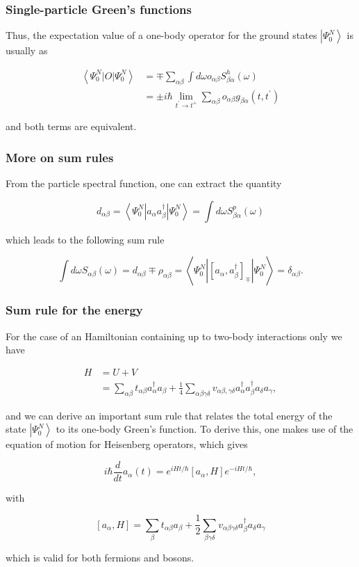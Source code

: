 \documentclass[compress]{beamer}
\begin{document}
\frame
{
\frametitle{Single-particle Green's functions}
\begin{small}
{\scriptsize
Thus, the expectation value of a one-body operator for the
ground states $\left|\Psi_{0}^{N}\right\rangle$ is usually as

$$
\begin{aligned}
\left\langle\Psi_{0}^{N}|O| \Psi_{0}^{N}\right\rangle & =\mp \sum_{\alpha \beta} \int d \omega o_{\alpha \beta} S_{\beta \alpha}^{h}(\omega) \\
& = \pm i \hbar \lim _{t^{\prime} \rightarrow t^{+}} \sum_{\alpha \beta} o_{\alpha \beta} g_{\beta \alpha}\left(t, t^{\prime}\right)
\end{aligned}
$$

and both terms are equivalent.

}
\end{small}
}


\frame
{
\frametitle{More on sum rules}
\begin{small}
{\scriptsize
From the particle spectral function, one can extract the quantity

$$
d_{\alpha \beta}=\left\langle\Psi_{0}^{N}\left|a_{\alpha} a_{\beta}^{\dagger}\right| \Psi_{0}^{N}\right\rangle=\int d \omega S_{\beta \alpha}^{p}(\omega)
$$

which leads to the following sum rule

$$
\int d \omega S_{\alpha \beta}(\omega)=d_{\alpha \beta} \mp \rho_{\alpha \beta}=\left\langle\Psi_{0}^{N}\left|\left[a_{\alpha}, a_{\beta}^{\dagger}\right]_{\mp}\right| \Psi_{0}^{N}\right\rangle=\delta_{\alpha \beta} .
$$

}
\end{small}
}
\frame
{
\frametitle{Sum rule for the energy}
\begin{small}
{\scriptsize
For the case of an Hamiltonian containing up to two-body interactions only we have

$$
\begin{aligned}
H & =U+V \\
& =\sum_{\alpha \beta} t_{\alpha \beta} a_{\alpha}^{\dagger} a_{\beta}+\frac{1}{4} \sum_{\alpha \beta \gamma \delta} v_{\alpha \beta, \gamma \delta} a_{\alpha}^{\dagger} a_{\beta}^{\dagger} a_{\delta} a_{\gamma},
\end{aligned}
$$

and we can derive an important sum rule that relates the total energy
of the state $\left|\Psi_{0}^{N}\right\rangle$ to its one-body Green's
function. To derive this, one makes use of the equation of motion for
Heisenberg operators, which gives

$$
i \hbar \frac{d}{d t} a_{\alpha}(t)=e^{i H t / \hbar}\left[a_{\alpha}, H\right] e^{-i H t / \hbar},
$$

with

$$
\left[a_{\alpha}, H\right]=\sum_{\beta} t_{\alpha \beta} a_{\beta}+\frac{1}{2} \sum_{\beta \gamma \delta} v_{\alpha \beta \gamma \delta} a_{\beta}^{\dagger} a_{\delta} a_{\gamma}
$$

which is valid for both fermions and bosons.

}
\end{small}
}
\end{document}
